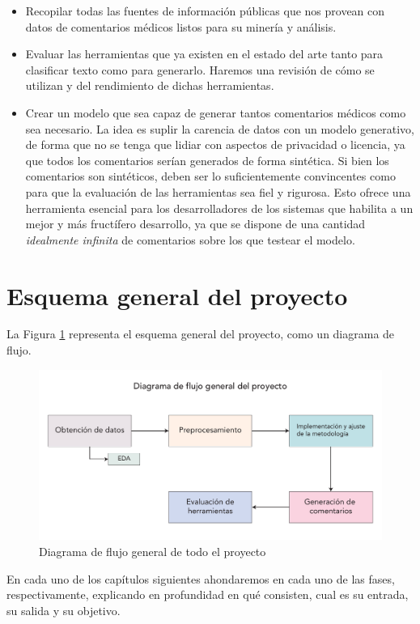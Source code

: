 \begin{itemize}
	\item Recopilar todas las fuentes de información públicas que nos provean con datos de comentarios médicos listos para su minería y análisis.
	\item Evaluar las herramientas que ya existen en el estado del arte tanto para clasificar texto como para generarlo. Haremos una revisión de cómo se utilizan y del rendimiento de dichas herramientas.
	\item Crear un modelo que sea capaz de generar tantos comentarios médicos como sea necesario. La idea es suplir la carencia de datos con un modelo generativo, de forma que no se tenga que lidiar con aspectos de privacidad o licencia, ya que todos los comentarios serían generados de forma sintética. Si bien los comentarios son sintéticos, deben ser lo suficientemente convincentes como para que la evaluación de las herramientas sea fiel y rigurosa. Esto ofrece una herramienta esencial para los desarrolladores de los sistemas que habilita a un mejor y más fructífero desarrollo, ya que se dispone de una cantidad \textit{idealmente infinita} de comentarios sobre los que testear el modelo.
\end{itemize}


\section{Esquema general del proyecto}

La Figura \ref{fig:general-diagram} representa el esquema general del proyecto, como un diagrama de flujo.
\begin{figure}[h]
	\centering
	\includegraphics[width=.9\textwidth]{media/general.pdf}
	\caption{Diagrama de flujo general de todo el proyecto}
	\label{fig:general-diagram}
\end{figure}

En cada uno de los capítulos siguientes ahondaremos en cada uno de las fases, respectivamente, explicando en profundidad en qué consisten, cual es su entrada, su salida y su objetivo.

